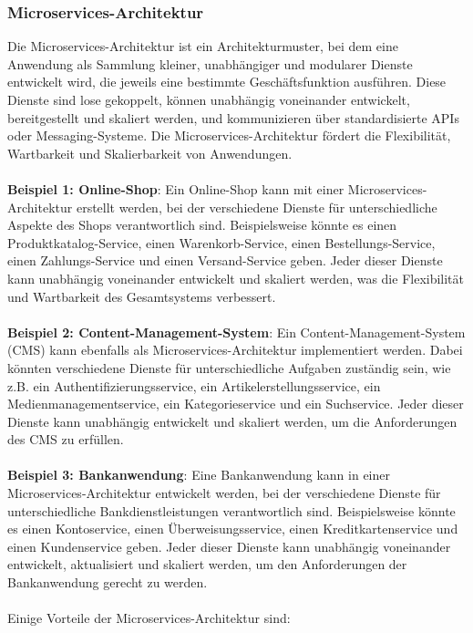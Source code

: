 \documentclass[../vs-script-first-v01.tex]{subfiles}
\begin{document}
\subsubsection{Microservices-Architektur}

Die Microservices-Architektur ist ein Architekturmuster, bei dem eine Anwendung als Sammlung kleiner, unabhängiger und modularer Dienste entwickelt wird, die jeweils eine bestimmte Geschäftsfunktion ausführen. Diese Dienste sind lose gekoppelt, können unabhängig voneinander entwickelt, bereitgestellt und skaliert werden, und kommunizieren über standardisierte APIs oder Messaging-Systeme. Die Microservices-Architektur fördert die Flexibilität, Wartbarkeit und Skalierbarkeit von Anwendungen.
\\\\
\textbf{Beispiel 1: Online-Shop}:
Ein Online-Shop kann mit einer Microservices-Architektur erstellt werden, bei der verschiedene Dienste für unterschiedliche Aspekte des Shops verantwortlich sind. Beispielsweise könnte es einen Produktkatalog-Service, einen Warenkorb-Service, einen Bestellungs-Service, einen Zahlungs-Service und einen Versand-Service geben. Jeder dieser Dienste kann unabhängig voneinander entwickelt und skaliert werden, was die Flexibilität und Wartbarkeit des Gesamtsystems verbessert.
\\\\
\textbf{Beispiel 2: Content-Management-System}:
Ein Content-Management-System (CMS) kann ebenfalls als Microservices-Architektur implementiert werden. Dabei könnten verschiedene Dienste für unterschiedliche Aufgaben zuständig sein, wie z.B. ein Authentifizierungsservice, ein Artikelerstellungsservice, ein Medienmanagementservice, ein Kategorieservice und ein Suchservice. Jeder dieser Dienste kann unabhängig entwickelt und skaliert werden, um die Anforderungen des CMS zu erfüllen.
\\\\
\textbf{Beispiel 3: Bankanwendung}:
Eine Bankanwendung kann in einer Microservices-Architektur entwickelt werden, bei der verschiedene Dienste für unterschiedliche Bankdienstleistungen verantwortlich sind. Beispielsweise könnte es einen Kontoservice, einen Überweisungsservice, einen Kreditkartenservice und einen Kundenservice geben. Jeder dieser Dienste kann unabhängig voneinander entwickelt, aktualisiert und skaliert werden, um den Anforderungen der Bankanwendung gerecht zu werden.
\\\\
Einige Vorteile der Microservices-Architektur sind:
\end{document}
